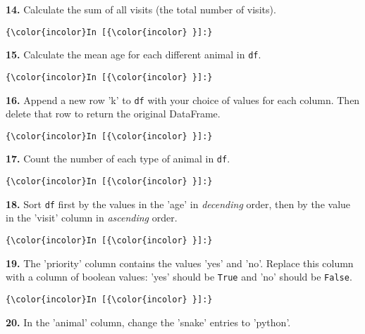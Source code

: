 \documentclass[11pt]{article}
\begin{document}
    \textbf{14.} Calculate the sum of all visits (the total number of
visits).

    \begin{Verbatim}[commandchars=\\\{\}]
{\color{incolor}In [{\color{incolor} }]:} 
\end{Verbatim}


    \textbf{15.} Calculate the mean age for each different animal in
\texttt{df}.

    \begin{Verbatim}[commandchars=\\\{\}]
{\color{incolor}In [{\color{incolor} }]:} 
\end{Verbatim}


    \textbf{16.} Append a new row 'k' to \texttt{df} with your choice of
values for each column. Then delete that row to return the original
DataFrame.

    \begin{Verbatim}[commandchars=\\\{\}]
{\color{incolor}In [{\color{incolor} }]:} 
\end{Verbatim}


    \textbf{17.} Count the number of each type of animal in \texttt{df}.

    \begin{Verbatim}[commandchars=\\\{\}]
{\color{incolor}In [{\color{incolor} }]:} 
\end{Verbatim}


    \textbf{18.} Sort \texttt{df} first by the values in the 'age' in
\emph{decending} order, then by the value in the 'visit' column in
\emph{ascending} order.

    \begin{Verbatim}[commandchars=\\\{\}]
{\color{incolor}In [{\color{incolor} }]:} 
\end{Verbatim}


    \textbf{19.} The 'priority' column contains the values 'yes' and 'no'.
Replace this column with a column of boolean values: 'yes' should be
\texttt{True} and 'no' should be \texttt{False}.

    \begin{Verbatim}[commandchars=\\\{\}]
{\color{incolor}In [{\color{incolor} }]:} 
\end{Verbatim}


    \textbf{20.} In the 'animal' column, change the 'snake' entries to
'python'.
\end{document}

